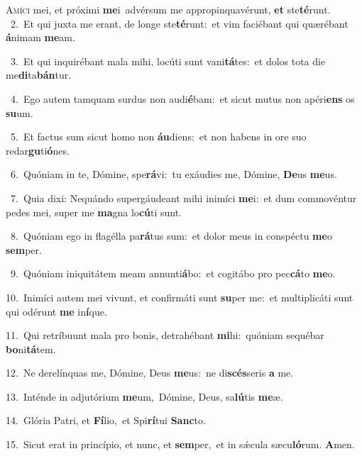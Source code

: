 \lettrine{\initial\textcolor{\initialcolor}{A}}{míci} mei, et próximi \textbf{me}\-i~\star advérsum me appropinquavérunt, \textbf{et} ste\-\textbf{té}\-runt.\\
{\numbfont\textcolor{\numbcolor}{~2.}}~Et qui juxta me erant, de longe ste\-\textbf{té}\-runt:~\star et vim faciébant qui quærébant \textbf{á}\-nimam \textbf{me}\-am.\par
{\numbfont\textcolor{\numbcolor}{~3.}}~Et qui inquirébant mala mihi, locúti sunt vani\-\textbf{tá}\-tes:~\star et dolos tota die me\-\textbf{di}\-ta\-\textbf{bán}\-tur.\par
{\numbfont\textcolor{\numbcolor}{~4.}}~Ego autem tamquam surdus non audi\-\textbf{é}\-bam:~\star et sicut mutus non apéri\textbf{ens} os \textbf{su}\-um.\par
{\numbfont\textcolor{\numbcolor}{~5.}}~Et factus sum sicut homo non \textbf{áu}\-diens:~\star et non habens in ore suo redar\-\textbf{gu}\-ti\-\textbf{ó}\-nes.\par
{\numbfont\textcolor{\numbcolor}{~6.}}~Quóniam in te, Dómine, spe\-\textbf{rá}\-vi:~\star tu exáudies me, Dómine, \textbf{De}\-us \textbf{me}\-us.\par
{\numbfont\textcolor{\numbcolor}{~7.}}~Quia dixi: Nequándo supergáudeant mihi inimíci \textbf{me}\-i:~\star et dum commovéntur pedes mei, super me \textbf{ma}\-gna lo\-\textbf{cú}\-ti sunt.\par
{\numbfont\textcolor{\numbcolor}{~8.}}~Quóniam ego in flagélla pa\-\textbf{rá}\-tus sum:~\star et dolor meus in conspéctu \textbf{me}\-o \textbf{sem}\-per.\par
{\numbfont\textcolor{\numbcolor}{~9.}}~Quóniam iniquitátem meam annunti\-\textbf{á}\-bo:~\star et cogitábo pro pec\-\textbf{cá}\-to \textbf{me}\-o.\par
{\numbfont\textcolor{\numbcolor}{10.}}~Inimíci autem mei vivunt, et confirmáti sunt \textbf{su}\-per me:~\star et multiplicáti sunt qui odérunt \textbf{me} in\-\textbf{í}\-que.\par
{\numbfont\textcolor{\numbcolor}{11.}}~Qui retríbuunt mala pro bonis, detrahébant \textbf{mi}\-hi:~\star quóniam sequébar \textbf{bo}\-ni\-\textbf{tá}\-tem.\par
{\numbfont\textcolor{\numbcolor}{12.}}~Ne derelínquas me, Dómine, Deus \textbf{me}\-us:~\star ne di\-\textbf{scés}\-seris \textbf{a} me.\par
{\numbfont\textcolor{\numbcolor}{13.}}~Inténde in adjutórium \textbf{me}\-um,~\star Dómine, Deus, sa\-\textbf{lú}\-tis \textbf{me}\-æ.\par
{\numbfont\textcolor{\numbcolor}{14.}}~Glória Patri, et \textbf{Fí}\-lio,~\star et Spi\-\textbf{rí}\-tui \textbf{Sanc}\-to.\par
{\numbfont\textcolor{\numbcolor}{15.}}~Sicut erat in princípio, et nunc, et \textbf{sem}\-per,~\star et in sǽcula sæcu\-\textbf{ló}\-rum. \textbf{A}\-men.\par
